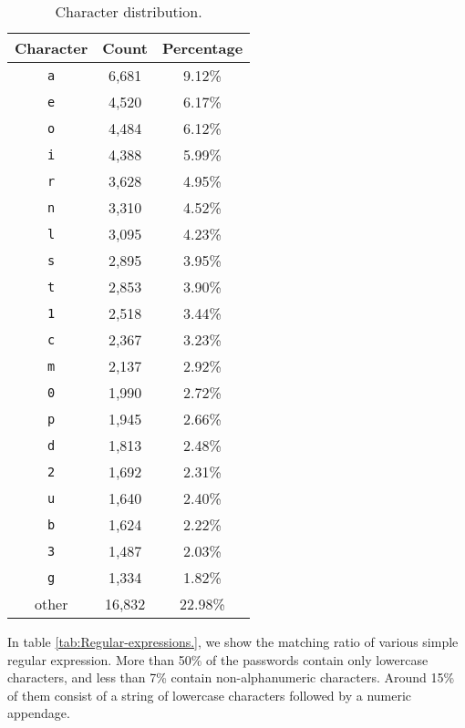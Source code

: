 \documentclass[a4paper,twocolumn]{article}
\providecommand{\tabularnewline}{\\}
\begin{document}
\begin{table}
\begin{centering}
\begin{tabular}{|c|c|c|}
\hline 
Character & Count & Percentage\tabularnewline
\hline
\hline 
\texttt{a} & 6,681 & 9.12\%\tabularnewline
\hline 
\texttt{e} & 4,520 & 6.17\%\tabularnewline
\hline 
\texttt{o} & 4,484 & 6.12\%\tabularnewline
\hline 
\texttt{i} & 4,388 & 5.99\%\tabularnewline
\hline 
\texttt{r} & 3,628 & 4.95\%\tabularnewline
\hline 
\texttt{n} & 3,310 & 4.52\%\tabularnewline
\hline 
\texttt{l} & 3,095 & 4.23\%\tabularnewline
\hline 
\texttt{s} & 2,895 & 3.95\%\tabularnewline
\hline 
\texttt{t} & 2,853 & 3.90\%\tabularnewline
\hline 
\texttt{1} & 2,518 & 3.44\%\tabularnewline
\hline 
\texttt{c} & 2,367 & 3.23\%\tabularnewline
\hline 
\texttt{m} & 2,137 & 2.92\%\tabularnewline
\hline 
\texttt{0} & 1,990 & 2.72\%\tabularnewline
\hline 
\texttt{p} & 1,945 & 2.66\%\tabularnewline
\hline 
\texttt{d} & 1,813 & 2.48\%\tabularnewline
\hline 
\texttt{2} & 1,692 & 2.31\%\tabularnewline
\hline 
\texttt{u} & 1,640 & 2.40\%\tabularnewline
\hline 
\texttt{b} & 1,624 & 2.22\%\tabularnewline
\hline 
\texttt{3} & 1,487 & 2.03\%\tabularnewline
\hline 
\texttt{g} & 1,334 & 1.82\%\tabularnewline
\hline 
other & 16,832 & 22.98\%\tabularnewline
\hline
\end{tabular}
\par\end{centering}

\caption{\label{tab:Character-distribution}Character distribution.}



\end{table}


In table \ref{tab:Regular-expressions.}, we show the matching ratio
of various simple regular expression. More than 50\% of the passwords
contain only lowercase characters, and less than 7\% contain non-alphanumeric
characters. Around 15\% of them consist of a string of lowercase characters
followed by a numeric appendage.
\end{document}
